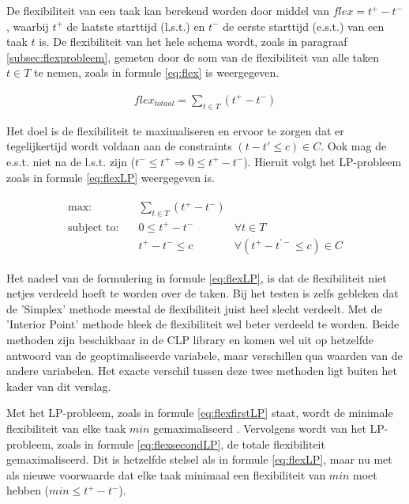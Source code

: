 De flexibiliteit van een taak kan berekend worden door middel van $flex = t^+ - t^-$, waarbij $t^+$ de laatste starttijd (l.s.t.) en $t^-$ de eerste starttijd (e.s.t.) van een taak $t$ is. De flexibiliteit van het hele schema wordt, zoals in paragraaf \ref{subsec:flexprobleem}, gemeten door de som van de flexibiliteit van alle taken $t \in T$ te nemen, zoals in formule \ref{eq:flex} is weergegeven. 

\begin{align}
\label{eq:flex}
    flex_{totaal} = \sum_{t \in T} (t^+ - t^-)
\end{align}

Het doel is de flexibiliteit te maximaliseren en ervoor te zorgen dat er tegelijkertijd wordt voldaan aan de constraints $(t - t' \leq c) \in C$. Ook mag de e.s.t. niet na de l.s.t. zijn ($t^- \leq t^+ \Rightarrow 0 \leq t^+ - t^-$). Hieruit volgt het LP-probleem zoals in formule \ref{eq:flexLP} weergegeven is.

\begin{align}
\label{eq:flexLP}
\begin{aligned}
        \text{max:}& \quad \sum_{t \in T} (t^+ - t^-) & \\
 \text{subject to:}& \quad 0 \leq t^+ - t^- & \forall t \in T \\
                   & \quad t^+ - t^- \leq c & \forall (t^+ - t^{'-} \leq c) \in C
\end{aligned}
\end{align}

Het nadeel van de formulering in formule \ref{eq:flexLP}, is dat de flexibiliteit niet netjes verdeeld hoeft te worden over de taken. Bij het testen is zelfs gebleken dat de 'Simplex' methode meestal de flexibiliteit juist heel slecht verdeelt. Met de 'Interior Point' methode bleek de flexibiliteit wel beter verdeeld te worden. Beide methoden zijn beschikbaar in de CLP library en komen wel uit op hetzelfde antwoord van de geoptimaliseerde variabele, maar verschillen qua waarden van de andere variabelen. Het exacte verschil tussen deze twee methoden ligt buiten het kader van dit verslag.

Met het LP-probleem, zoals in formule \ref{eq:flexfirstLP} staat, wordt de minimale flexibiliteit van elke taak $min$ gemaximaliseerd \cite{wilmer13}. Vervolgens wordt van het LP-probleem, zoals in formule \ref{eq:flexsecondLP}, de totale flexibiliteit gemaximaliseerd. Dit is hetzelfde stelsel als in formule \ref{eq:flexLP}, maar nu met als nieuwe voorwaarde dat elke taak minimaal een flexibiliteit van $min$ moet hebben ($min \leq t^+ - t^ -$). 

